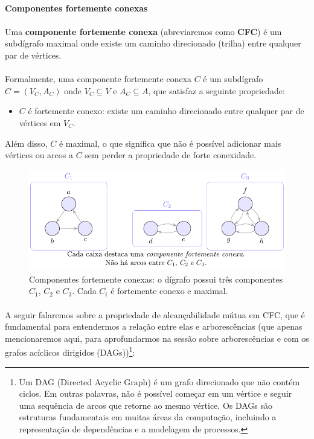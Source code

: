\documentclass[12pt,a4paper]{article}
\def\emph#1{#1}%
\begin{document}
\paragraph{Componentes fortemente conexas}
\paragraph{}Uma \textbf{componente fortemente conexa} (abreviaremos como \textbf{CFC}) é um subdígrafo maximal onde existe um caminho direcionado (trilha) entre qualquer par de vértices.

\paragraph{}
Formalmente, uma componente fortemente conexa \(C\) é um subdígrafo \(C = (V_C, A_C)\) onde \(V_C \subseteq V\) e \(A_C \subseteq A\), que satisfaz a seguinte propriedade:
\begin{itemize}
    \item \(C\) é fortemente conexo: existe um caminho direcionado entre qualquer par de vértices em \(V_C\).
\end{itemize}
Além disso, \(C\) é maximal, o que significa que não é possível adicionar mais vértices ou arcos a \(C\) sem perder a propriedade de forte conexidade.

\begin{figure}[H]
    \centering
    \includegraphics[width=0.9\linewidth]{figures/figure_028.pdf}

    \caption{Componentes fortemente conexas: o dígrafo possui três componentes $C_1$, $C_2$ e $C_3$. Cada $C_i$ é fortemente conexo e \emph{maximal}.}
\end{figure}


\paragraph{}
A seguir falaremos sobre a propriedade de alcançabilidade mútua em CFC, que é fundamental para entendermos a relação entre elas e arborescências (que apenas mencionaremos aqui, para aprofundarmos na sessão sobre arborescências e com os grafos acíclicos dirigidos (DAGs))\footnote{Um DAG (Directed Acyclic Graph) é um grafo direcionado que não contém ciclos. Em outras palavras, não é possível começar em um vértice e seguir uma sequência de arcos que retorne ao mesmo vértice. Os DAGs são estruturas fundamentais em muitas áreas da computação, incluindo a representação de dependências e a modelagem de processos.}:
\end{document}
